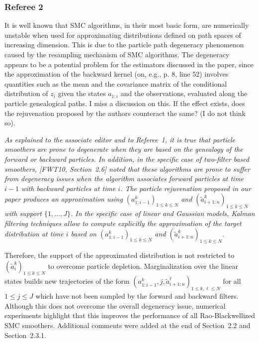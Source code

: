 \vspace{.2cm}



\subsubsection*{Referee 2}
\noindent It is well known that SMC algorithms, in their most basic form, are numerically unstable
when used for approximating distributions defined on path spaces of increasing dimension. This is due to the particle path degeneracy phenomenon caused by the resampling mechanism of SMC algorithms. The degeneracy appears to be a potential problem for the estimators discussed in the paper, since the approximation of the
backward kernel (on, e.g., p. 8, line 52) involves quantities such as the mean and the
covariance matrix of the conditional distribution of $z_i$ given the states $a_{1:i}$ and the observations,
evaluated along the particle genealogical paths. I miss a discussion on this. If the effect exists, does the rejuvenation proposed by the authors counteract the same? (I do not think so).

\vspace{.2cm}
{\em
\noindent As explained to the associate editor and to  Referee~1, it is true that particle smoothers are prone to degenerate when they are based on  the genealogy of the forward or backward particles. In addition, in the specific case of two-filter based smoothers, [FWT10, Section~2.6] noted that these algorithms are prone to suffer from degeneracy issues when the algorithm associates forward particles at time $i-1$ with backward particles at time $i$. 
The particle rejuvenation proposed in our paper produces an approximation using $(a^k_{1:i-1})_{1\le k \le N}$ and $(\tilde{a}^k_{i+1:n})_{1\le k \le N}$ with support $\{1,\ldots,J\}$. In the specific case of linear and Gaussian models, Kalman filtering techniques allow to compute explicitly the approximation of the target distribution at time $i$ based on  $(a^k_{1:i-1})_{1\le k \le N}$ and $(\tilde{a}^k_{i+1:n})_{1\le k \le N}$. 

Therefore, the support of the approximated distribution is not restricted to $(\tilde{a}^k_{i})_{1\le k \le N}$ to overcome particle depletion. Marginalization over the linear states  builds new trajectories of the form $(a^k_{1:i-1},j,\tilde{a}^\ell_{i+1:n})_{1\le k,\ell \le N}$ for all $1\le j \le J$ which have not been sampled by the forward and backward filters. Although this does not overcome the overall degeneracy issue, numerical experiments highlight that this improves the performance of all Rao-Blackwellized SMC smoothers. Additional comments were added at the end of Section~2.2 and Section~2.3.1.
}


